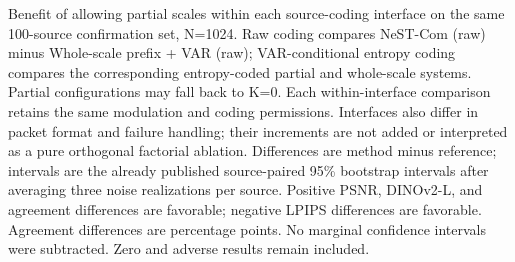 Benefit of allowing partial scales within each source-coding interface on the same 100-source confirmation set, N=1024. Raw coding compares NeST-Com (raw) minus Whole-scale prefix + VAR (raw); VAR-conditional entropy coding compares the corresponding entropy-coded partial and whole-scale systems. Partial configurations may fall back to K=0. Each within-interface comparison retains the same modulation and coding permissions. Interfaces also differ in packet format and failure handling; their increments are not added or interpreted as a pure orthogonal factorial ablation. Differences are method minus reference; intervals are the already published source-paired 95\% bootstrap intervals after averaging three noise realizations per source. Positive PSNR, DINOv2-L, and agreement differences are favorable; negative LPIPS differences are favorable. Agreement differences are percentage points. No marginal confidence intervals were subtracted. Zero and adverse results remain included.

